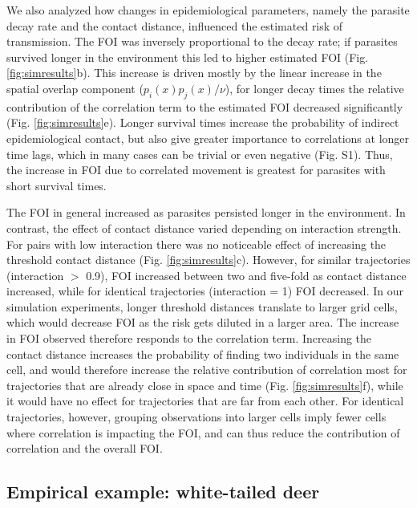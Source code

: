\documentclass[letterpaper]{article}
\begin{document}
We also analyzed how changes in epidemiological parameters, namely the parasite decay rate and the contact distance, influenced the estimated risk of transmission. 
The FOI was inversely proportional to the decay rate; if parasites survived longer in the environment this led to higher estimated FOI (Fig. \ref{fig:simresults}b). This increase is driven mostly by the linear increase in the spatial overlap component ($p_i(x)p_j(x)/\nu$), for longer decay times the relative contribution of the correlation term to the estimated FOI decreased significantly (Fig. \ref{fig:simresults}e). Longer survival times increase the probability of indirect epidemiological contact, but also give greater importance to correlations at longer time lags, which in many cases can be trivial or even negative  (Fig. S1). Thus, the increase in FOI due to correlated movement is greatest for parasites with short survival times. 

The FOI in general increased as parasites persisted longer in the environment. In contrast, the effect of contact distance varied depending on interaction strength. For pairs with low interaction there was no noticeable effect of increasing the threshold contact distance (Fig. \ref{fig:simresults}c). However, for  similar trajectories (interaction $>$ 0.9), FOI increased between two and five-fold as contact distance increased, while for identical trajectories (interaction = 1) FOI decreased. 
In our simulation experiments, longer threshold distances translate to larger grid cells, which would decrease FOI as the risk gets diluted in a larger area. The increase in FOI observed therefore responds to the correlation term. Increasing the contact distance increases the probability of finding two individuals in the same cell, and would therefore increase the relative contribution of correlation most for trajectories that are already close in space and time (Fig. \ref{fig:simresults}f), while it would have no effect for trajectories that are far from each other. For identical trajectories, however, grouping observations into larger cells imply fewer cells where correlation is impacting the FOI, and can thus reduce the contribution of correlation and the overall FOI. 

\subsection*{Empirical example: white-tailed deer}
\end{document}
